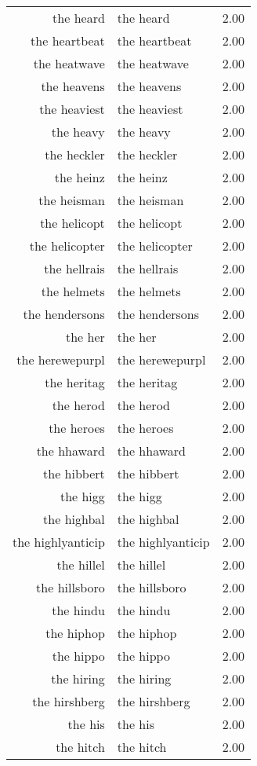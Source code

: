 \begin{table}[ht]
\begin{tabular}{rlr}
  the heard & the heard & 2.00 \\ 
  the heartbeat & the heartbeat & 2.00 \\ 
  the heatwave & the heatwave & 2.00 \\ 
  the heavens & the heavens & 2.00 \\ 
  the heaviest & the heaviest & 2.00 \\ 
  the heavy & the heavy & 2.00 \\ 
  the heckler & the heckler & 2.00 \\ 
  the heinz & the heinz & 2.00 \\ 
  the heisman & the heisman & 2.00 \\ 
  the helicopt & the helicopt & 2.00 \\ 
  the helicopter & the helicopter & 2.00 \\ 
  the hellrais & the hellrais & 2.00 \\ 
  the helmets & the helmets & 2.00 \\ 
  the hendersons & the hendersons & 2.00 \\ 
  the her & the her & 2.00 \\ 
  the herewepurpl & the herewepurpl & 2.00 \\ 
  the heritag & the heritag & 2.00 \\ 
  the herod & the herod & 2.00 \\ 
  the heroes & the heroes & 2.00 \\ 
  the hhaward & the hhaward & 2.00 \\ 
  the hibbert & the hibbert & 2.00 \\ 
  the higg & the higg & 2.00 \\ 
  the highbal & the highbal & 2.00 \\ 
  the highlyanticip & the highlyanticip & 2.00 \\ 
  the hillel & the hillel & 2.00 \\ 
  the hillsboro & the hillsboro & 2.00 \\ 
  the hindu & the hindu & 2.00 \\ 
  the hiphop & the hiphop & 2.00 \\ 
  the hippo & the hippo & 2.00 \\ 
  the hiring & the hiring & 2.00 \\ 
  the hirshberg & the hirshberg & 2.00 \\ 
  the his & the his & 2.00 \\ 
  the hitch & the hitch & 2.00 \\ 

\end{tabular}
\end{table}
